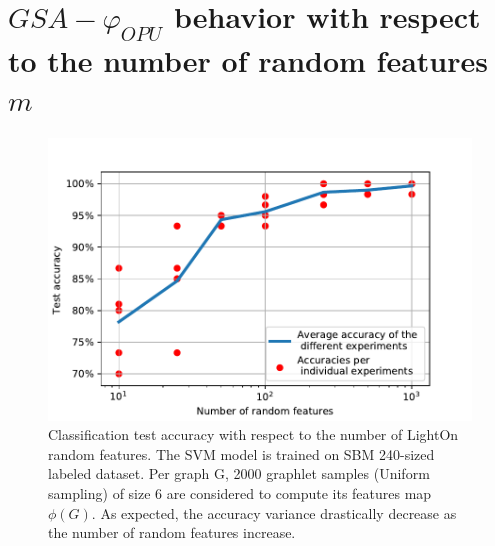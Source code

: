 \section{$GSA-\varphi_{OPU}$ behavior with respect to the number of random features $m$}
\begin{figure}[H]
\centering
\includegraphics[scale=0.5]{Dissertation/figs/LightON_adj_SBM_varying_RF.PDF}
\caption[Classification test accuracy as a function of the number of random features]{Classification test accuracy with respect to the number of LightOn random features. The SVM model is trained on SBM 240-sized labeled dataset. Per graph G, 2000 graphlet samples (Uniform sampling) of size 6 are considered to compute its features map $\phi(G)$. As expected, the accuracy variance drastically decrease as the number of random features increase. }
\label{fig:LightOn_adj_SBM_RF}
\end{figure}

